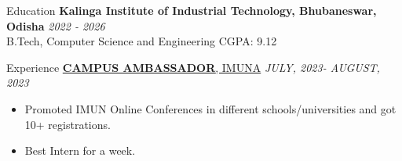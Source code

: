 \documentclass{resume} %
\begin{document}
\begin{rSection}{Education}
{\bf Kalinga Institute of Industrial Technology, Bhubaneswar, Odisha} \hfill {\em 2022 - 2026} 
\\ B.Tech, Computer Science and Engineering \hfill {CGPA: 9.12}

\end{rSection}
\begin{rSection}{Experience}
\href{https://1drv.ms/i/s!AqmF3ryI8xyngdlvi5puoHlWRF5NTQ?e=hyfCRH}{{\bf CAMPUS AMBASSADOR}{, IMUNA}} \hfill {\em JULY, 2023- AUGUST, 2023}
\begin{itemize}
    \item Promoted IMUN Online Conferences in different schools/universities and got 10+ registrations.
    \item Best Intern for a week.
\end{itemize}
\end{rSection}
\end{document}
